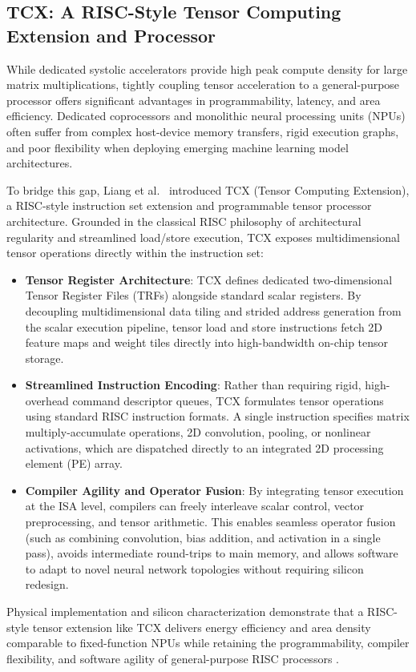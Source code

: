 \subsection{TCX: A RISC-Style Tensor Computing Extension and Processor}\label{sec:tcx_tensor_extension}

While dedicated systolic accelerators provide high peak compute density for large matrix multiplications, tightly coupling tensor acceleration to a general-purpose processor offers significant advantages in programmability, latency, and area efficiency. Dedicated coprocessors and monolithic neural processing units (NPUs) often suffer from complex host-device memory transfers, rigid execution graphs, and poor flexibility when deploying emerging machine learning model architectures.

To bridge this gap, Liang et al.~\cite{liang2023tcx} introduced TCX (Tensor Computing Extension), a RISC-style instruction set extension and programmable tensor processor architecture. Grounded in the classical RISC philosophy of architectural regularity and streamlined load/store execution, TCX exposes multidimensional tensor operations directly within the instruction set:
\begin{itemize}
    \item \textbf{Tensor Register Architecture}: TCX defines dedicated two-dimensional Tensor Register Files (TRFs) alongside standard scalar registers. By decoupling multidimensional data tiling and strided address generation from the scalar execution pipeline, tensor load and store instructions fetch 2D feature maps and weight tiles directly into high-bandwidth on-chip tensor storage.
    
    \item \textbf{Streamlined Instruction Encoding}: Rather than requiring rigid, high-overhead command descriptor queues, TCX formulates tensor operations using standard RISC instruction formats. A single instruction specifies matrix multiply-accumulate operations, 2D convolution, pooling, or nonlinear activations, which are dispatched directly to an integrated 2D processing element (PE) array.
    
    \item \textbf{Compiler Agility and Operator Fusion}: By integrating tensor execution at the ISA level, compilers can freely interleave scalar control, vector preprocessing, and tensor arithmetic. This enables seamless operator fusion (such as combining convolution, bias addition, and activation in a single pass), avoids intermediate round-trips to main memory, and allows software to adapt to novel neural network topologies without requiring silicon redesign.
\end{itemize}
Physical implementation and silicon characterization demonstrate that a RISC-style tensor extension like TCX delivers energy efficiency and area density comparable to fixed-function NPUs while retaining the programmability, compiler flexibility, and software agility of general-purpose RISC processors \cite{liang2023tcx}.

